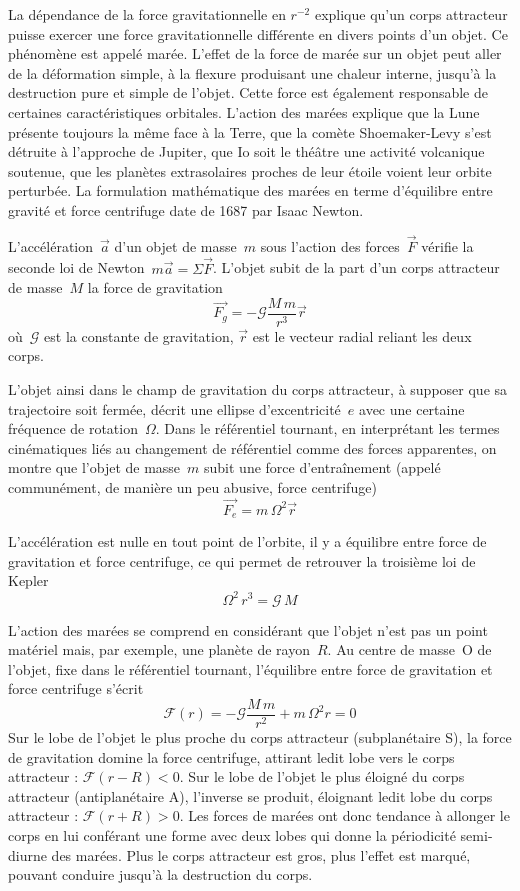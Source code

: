 
\sk
La dépendance de la force gravitationnelle en $r^{-2}$ explique qu'un corps attracteur puisse exercer une force gravitationnelle différente en divers points d'un objet. Ce phénomène est appelé marée. L'effet de la force de marée sur un objet peut aller de la déformation simple, à la flexure produisant une chaleur interne, jusqu'à la destruction pure et simple de l'objet. Cette force est également responsable de certaines caractéristiques orbitales. L'action des marées explique que la Lune présente toujours la même face à la Terre, que la comète Shoemaker-Levy s'est détruite à l'approche de Jupiter, que Io soit le théâtre une activité volcanique soutenue, que les planètes extrasolaires proches de leur étoile voient leur orbite perturbée. La formulation mathématique des marées en terme d'équilibre entre gravité et force centrifuge date de 1687 par Isaac Newton. 

\sk
L'accélération~$\vec{a}$ d'un objet de masse~$m$ sous l'action des forces~$\vec{F}$ vérifie la seconde loi de Newton~$m \vec{a} = \Sigma \vec{F}$. L'objet subit de la part d'un corps attracteur de masse~$M$ la force de gravitation
\[ \vec{F_g} = -\mathcal{G} \frac{M\,m}{r^3} \vec{r} \]
\noindent où~$\mathcal{G}$ est la constante de gravitation, $\vec{r}$ est le vecteur radial reliant les deux corps. 

\sk
L'objet ainsi dans le champ de gravitation du corps attracteur, à supposer que sa trajectoire soit fermée, décrit une ellipse d'excentricité~$e$ avec une certaine fréquence de rotation~$\Omega$. Dans le référentiel tournant, en interprétant les termes cinématiques liés au changement de référentiel comme des forces apparentes, on montre que l'objet de masse~$m$ subit une force d'entraînement (appelé communément, de manière un peu abusive, force centrifuge)
\[ \vec{F_e} = m \, \Omega^2 \vec{r} \]

\sk
L'accélération est nulle en tout point de l'orbite, il y a équilibre entre force de gravitation et force centrifuge, ce qui permet de retrouver la troisième loi de Kepler
\[ \Omega^2 \, r^3 = \mathcal{G} \, M  \]

\sk
L'action des marées se comprend en considérant que l'objet n'est pas un point matériel mais, par exemple, une planète de rayon~$R$. Au centre de masse~O de l'objet, fixe dans le référentiel tournant, l'équilibre entre force de gravitation et force centrifuge s'écrit
\[ \mathcal{F}(r) = -\mathcal{G} \frac{M\,m}{r^2} + m \, \Omega^2 r = 0 \]
Sur le lobe de l'objet le plus proche du corps attracteur (subplanétaire S), la force de gravitation domine la force centrifuge, attirant ledit lobe vers le corps attracteur : $\mathcal{F}(r-R) < 0$. Sur le lobe de l'objet le plus éloigné du corps attracteur (antiplanétaire A), l'inverse se produit, éloignant ledit lobe du corps attracteur : $\mathcal{F}(r+R) > 0$. Les forces de marées ont donc tendance à allonger le corps en lui conférant une forme avec deux lobes qui donne la périodicité semi-diurne des marées. Plus le corps attracteur est gros, plus l'effet est marqué, pouvant conduire jusqu'à la destruction du corps.

